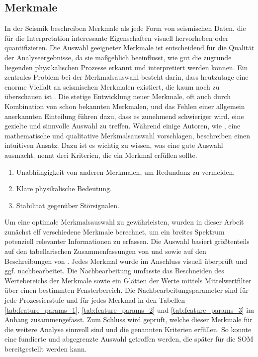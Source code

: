 \subsection{Merkmale}

In der Seismik beschreiben \textcite{chopra_seismic_2007} Merkmale als jede Form von seismischen Daten, die für die Interpretation interessante Eigenschaften visuell hervorheben oder quantifizieren. Die Auswahl geeigneter Merkmale ist entscheidend für die Qualität der Analyseergebnisse, da sie maßgeblich beeinflusst, wie gut die zugrunde liegenden physikalischen Prozesse erkannt und interpretiert werden können. Ein zentrales Problem bei der Merkmalsauswahl besteht darin, dass heutzutage eine enorme Vielfalt an seismischen Merkmalen existiert, die kaum noch zu überschauen ist \parencites{zhao_seismic_2018}{qi_seismic_2020}{barnes_too_2006}. Die stetige Entwicklung neuer Merkmale, oft auch durch Kombination von schon bekannten Merkmalen, und das Fehlen einer allgemein anerkannten Einteilung \parencite{roden_geologic_2015} führen dazu, dass es zunehmend schwieriger wird, eine gezielte und sinnvolle Auswahl zu treffen. Während einige Autoren, wie \textcite{zhao_seismic_2018}, eine mathematische und qualitative Merkmalsauswahl vorschlagen, beschreiben \textcite{chopra_seismic_2007} einen intuitiven Ansatz. Dazu ist es wichtig zu wissen, was eine gute Auswahl ausmacht. \textcite{barnes_too_2006} nennt drei Kriterien, die ein Merkmal erfüllen sollte. \\
\newpage

\begin{enumerate}
    \item Unabhängigkeit von anderen Merkmalen, um Redundanz zu vermeiden.
    \item Klare physikalische Bedeutung.
    \item Stabilität gegenüber Störsignalen.
\end{enumerate}
Um eine optimale Merkmalsauswahl zu gewährleisten, wurden in dieser Arbeit zunächst elf verschiedene Merkmale berechnet, um ein breites Spektrum potenziell relevanter Informationen zu erfassen. Die Auswahl basiert größtenteils auf den tabellarischen Zusammenfassungen von \textcite{roden_geologic_2015} und \textcite{barnes_too_2006} sowie auf den Beschreibungen von \textcite{chopra_seismic_2007}. Jedes Merkmal wurde im Anschluss visuell überprüft und ggf. nachbearbeitet. Die Nachbearbeitung umfasste das Beschneiden des Wertebereichs der Merkmale sowie ein Glätten der Werte mittels Mittelwertfilter über einen bestimmten Fensterbereich. Die Nachbearbeitungsparameter sind für jede Prozessierstufe und für jedes Merkmal in den Tabellen \ref{tab:feature_params_1}, \ref{tab:feature_params_2} und \ref{tab:feature_params_3} im Anhang zusammengefasst. Zum Schluss wird geprüft, welche dieser Merkmale für die weitere Analyse sinnvoll sind und die genannten Kriterien erfüllen. So konnte eine fundierte und abgegrenzte Auswahl getroffen werden, die später für die SOM bereitgestellt werden kann.

